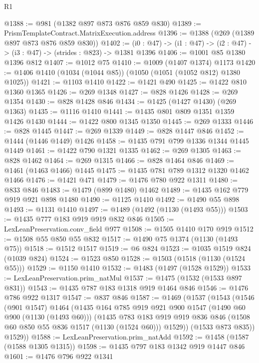 \begin{lexlean}{R1}
\begin{coremodule}
@1388 := @981 (@1382 @897 @873 @876 @859 @830)
@1389 := PrismTemplateContract.MatrixExecution.address
@1396 := @1388 (@269 (@1389 @897 @873 @876 @859 @830))
@1402 := (i0 : @47) -> (i1 : @47) -> (i2 : @47) -> (i3 : @47) -> (strides : @823) -> @1381 @1396
@1406 := @1001 @85 @1380 @1396 @812
@1407 := @1012 @75
@1410 := @1009 (@1407 @1374) @1173
@1420 := @1406 @1410 (@1034 (@1044 @85)) (@1050 (@1051 (@1052 @812) @1380 @1025))
@1421 := @1103 @1410
@1422 := @1421 @490
@1425 := @1422 @810 @1360 @1365
@1426 := @269 @1348
@1427 := @828 @1426
@1428 := @269 @1354
@1430 := @828 @1428 @846
@1434 := @1425 (@1427 @1430) (@269 @1363)
@1435 := @1116 @1410
@1441 := @1435 @801 @809 @1351 @1359 @1426 @1430
@1444 := @1422 @800 @1345 @1350
@1445 := @269 @1333
@1446 := @828 @1445
@1447 := @269 @1339
@1449 := @828 @1447 @846
@1452 := @1444 (@1446 @1449) @1426
@1458 := @1435 @791 @799 @1336 @1344 @1445 @1449
@1461 := @1422 @790 @1321 @1335
@1462 := @269 @1305
@1463 := @828 @1462
@1464 := @269 @1315
@1466 := @828 @1464 @846
@1469 := @1461 (@1463 @1466) @1445
@1475 := @1435 @781 @789 @1312 @1320 @1462 @1466
@1476 := @1421 @471
@1479 := @1476 @780 @922 @1311
@1480 := @833 @846
@1483 := @1479 (@899 @1480) @1462
@1489 := @1435 @162 @779 @919 @921 @898 @1480
@1490 := @1125 @1410
@1492 := @1490 @55 @898
@1493 := @1131 @1410
@1497 := @1489 (@1492 (@1130 (@1493 @55)))
@1503 := @1435 @777 @183 @919 @919 @832 @846
@1505 := LexLeanPreservation.conv_field @977
@1508 := @1505 @1410 @170 @919
@1512 := @1508 @55 @850 @55 @832
@1517 := @1490 @75 @1374 (@1130 (@1493 @75))
@1518 := @1512 @1517
@1519 := @6 @824
@1523 := @1035 @1519 @824 (@1039 @824)
@1524 := @1523 @850
@1528 := @1503 (@1518 (@1130 (@1524 @55)))
@1529 := @1150 @1410
@1532 := @1483 (@1497 (@1528 @1529))
@1533 := LexLeanPreservation.prim_natMul
@1537 := @1475 (@1532 (@1533 @897 @831))
@1543 := @1435 @787 @183 @1318 @919 @1464 @846
@1546 := @1476 @786 @922 @1317
@1547 := @837 @846
@1587 := @1469
    (@1537
      (@1543
        (@1546
          (@901 @1547)
          @1464
          (@1435
            @164
            @785
            @919
            @921
            @900
            @1547
            (@1490 @60 @900 (@1130 (@1493 @60)))
            (@1435
              @783
              @183
              @919
              @919
              @836
              @846
              (@1508 @60 @850 @55 @836 @1517 (@1130 (@1524 @60)))
              @1529))
          (@1533 @873 @835))
        @1529))
@1588 := LexLeanPreservation.prim_natAdd
@1592 := @1458 (@1587 (@1588 @1305 @1315))
@1598 := @1435 @797 @183 @1342 @919 @1447 @846
@1601 := @1476 @796 @922 @1341

\end{coremodule}
\end{lexlean}
